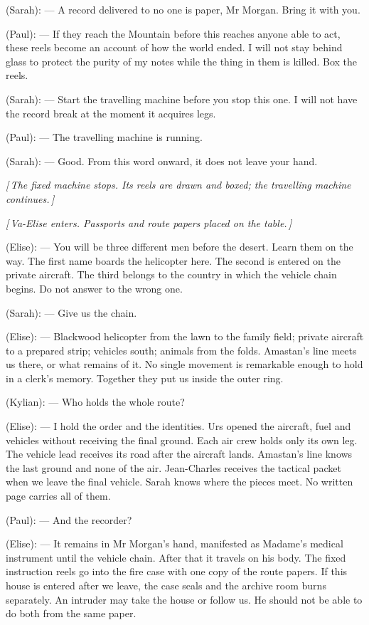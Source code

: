 \begin{room}
(Sarah): --- A record delivered to no one is paper, Mr Morgan. Bring it with you.

(Paul): --- If they reach the Mountain before this reaches anyone able to act, these reels become an account of how the world ended. I will not stay behind glass to protect the purity of my notes while the thing in them is killed. Box the reels.

(Sarah): --- Start the travelling machine before you stop this one. I will not have the record break at the moment it acquires legs.

(Paul): --- The travelling machine is running.

(Sarah): --- Good. From this word onward, it does not leave your hand.

\centerline{\textit{[\,The fixed machine stops. Its reels are drawn and boxed; the travelling machine continues.\,]}}

\centerline{\textit{[\,Va-Elise enters. Passports and route papers placed on the table.\,]}}

(Elise): --- You will be three different men before the desert. Learn them on the way. The first name boards the helicopter here. The second is entered on the private aircraft. The third belongs to the country in which the vehicle chain begins. Do not answer to the wrong one.

(Sarah): --- Give us the chain.

(Elise): --- Blackwood helicopter from the lawn to the family field; private aircraft to a prepared strip; vehicles south; animals from the folds. Amastan's line meets us there, or what remains of it. No single movement is remarkable enough to hold in a clerk's memory. Together they put us inside the outer ring.

(Kylian): --- Who holds the whole route?

(Elise): --- I hold the order and the identities. Urs opened the aircraft, fuel and vehicles without receiving the final ground. Each air crew holds only its own leg. The vehicle lead receives its road after the aircraft lands. Amastan's line knows the last ground and none of the air. Jean-Charles receives the tactical packet when we leave the final vehicle. Sarah knows where the pieces meet. No written page carries all of them.

(Paul): --- And the recorder?

(Elise): --- It remains in Mr Morgan's hand, manifested as Madame's medical instrument until the vehicle chain. After that it travels on his body. The fixed instruction reels go into the fire case with one copy of the route papers. If this house is entered after we leave, the case seals and the archive room burns separately. An intruder may take the house or follow us. He should not be able to do both from the same paper.


\end{room}
